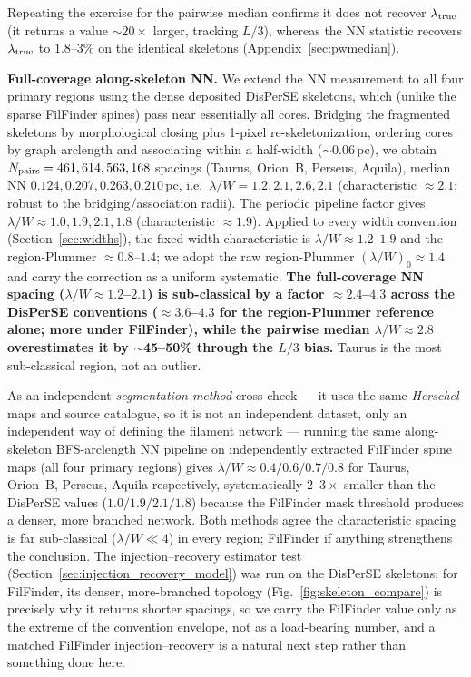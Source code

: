 \documentclass[usenatbib,twoside,twocolumn]{mnras}
\begin{document}
Repeating the exercise for the pairwise median confirms it does not recover $\lambda_{\rm true}$ (it returns a value $\sim$$20\times$ larger, tracking $L/3$), whereas the NN statistic recovers $\lambda_{\rm true}$ to $1.8$--$3\%$ on the identical skeletons (Appendix~\ref{sec:pwmedian}).

\textbf{Full-coverage along-skeleton NN.} We extend the NN measurement to all four primary regions using the dense deposited DisPerSE skeletons, which (unlike the sparse FilFinder spines) pass near essentially all cores. Bridging the fragmented skeletons by morphological closing plus 1-pixel re-skeletonization, ordering cores by graph arclength and associating within a half-width ($\sim$0.06\,pc), we obtain $N_{\rm pairs}=461,614,563,168$ spacings (Taurus, Orion~B, Perseus, Aquila), median NN $0.124,0.207,0.263,0.210$\,pc, i.e.\ $\lambda/W=1.2,2.1,2.6,2.1$ (characteristic $\approx2.1$; robust to the bridging/association radii). The periodic pipeline factor gives $\lambda/W\approx1.0,1.9,2.1,1.8$ (characteristic $\approx1.9$). Applied to every width convention (Section~\ref{sec:widths}), the fixed-width characteristic is $\lambda/W\approx1.2$--$1.9$ and the region-Plummer $\approx0.8$--$1.4$; we adopt the raw region-Plummer $(\lambda/W)_0\approx1.4$ and carry the correction as a uniform systematic. \textbf{The full-coverage NN spacing ($\lambda/W\approx1.2$--$2.1$) is sub-classical by a factor $\approx2.4$--$4.3$ across the DisPerSE conventions ($\approx3.6$--$4.3$ for the region-Plummer reference alone; more under FilFinder), while the pairwise median $\lambda/W\approx2.8$ overestimates it by $\sim$45--50\% through the $L/3$ bias.} Taurus is the most sub-classical region, not an outlier.

As an independent \emph{segmentation-method} cross-check --- it uses the same \textit{Herschel} maps and source catalogue, so it is not an independent dataset, only an independent way of defining the filament network --- running the same along-skeleton BFS-arclength NN pipeline on independently extracted FilFinder spine maps (all four primary regions) gives $\lambda/W\approx0.4/0.6/0.7/0.8$ for Taurus, Orion~B, Perseus, Aquila respectively, systematically $2$--$3\times$ smaller than the DisPerSE values ($1.0/1.9/2.1/1.8$) because the FilFinder mask threshold produces a denser, more branched network. Both methods agree the characteristic spacing is far sub-classical ($\lambda/W\ll4$) in every region; FilFinder if anything strengthens the conclusion. The injection--recovery estimator test (Section~\ref{sec:injection_recovery_model}) was run on the DisPerSE skeletons; for FilFinder, its denser, more-branched topology (Fig.~\ref{fig:skeleton_compare}) is precisely why it returns shorter spacings, so we carry the FilFinder value only as the extreme of the convention envelope, not as a load-bearing number, and a matched FilFinder injection--recovery is a natural next step rather than something done here.
\end{document}
